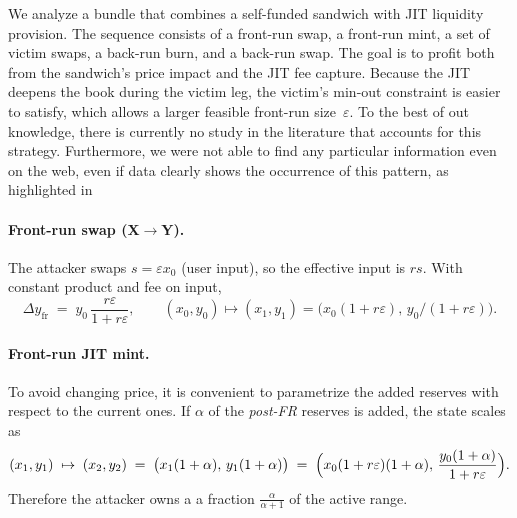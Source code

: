 \documentclass[a4paper,11pt]{article}
\begin{document}
We analyze a bundle that combines a self-funded sandwich with JIT liquidity provision. The sequence consists of a front-run swap, a front-run mint, a set of victim swaps, a back-run burn, and a back-run swap. The goal is to profit both from the sandwich’s price impact and the JIT fee capture. Because the JIT deepens the book during the victim leg, the victim’s min-out constraint is easier to satisfy, which allows a larger feasible front-run size~$\varepsilon$. To the best of out knowledge, there is currently no study in the literature that accounts for this strategy. Furthermore, we were not able to find any particular information even on the web, even if data clearly shows the occurrence of this pattern, as highlighted in \cite{gatta_di_nosse}

\paragraph{Front-run swap (X$\to$Y).}
The attacker swaps $s=\varepsilon x_0$ (user input), so the effective input is $r s$. With constant product and fee on input,
\begin{equation}
  \Delta y_{\mathrm{fr}} \;=\; y_0\,\frac{r\varepsilon}{1+r\varepsilon},
  \qquad
  (x_0,y_0)\mapsto (x_1,y_1)=\bigl(x_0(1+r\varepsilon),\, y_0/(1+r\varepsilon)\bigr).
  \label{eq:mix_dyfr}
\end{equation}

\paragraph{Front-run JIT mint.}
To avoid changing price, it is convenient to parametrize the added reserves with respect to the current ones. If $\alpha$ of the \emph{post-FR} reserves is added, the state scales as
\begin{equation}
  (x_1,y_1) \;\mapsto\; (x_2,y_2) \;=\; \bigl(x_1(1+\alpha),\, y_1(1+\alpha)\bigr)
  \;=\; \Bigl(x_0(1+r\varepsilon)(1+\alpha),\, \frac{y_0(1+\alpha)}{1+r\varepsilon}\Bigr).
  \label{eq:mix_mint}
\end{equation}
Therefore the attacker owns a a fraction $\frac{\alpha}{\alpha + 1}$ of the active range.
\end{document}
